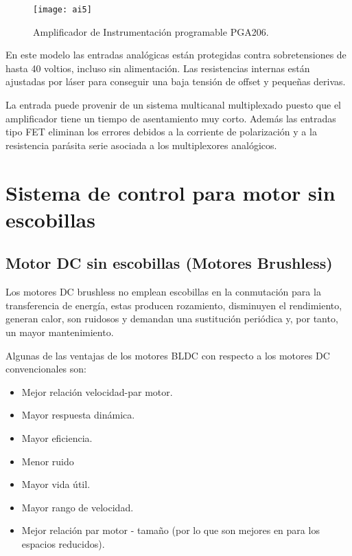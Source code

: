 \begin{figure}[h]
  \centering
  \texttt{[image: ai5]}
  \caption{Amplificador de Instrumentación programable PGA206.}\label{fig:programable}
\end{figure}

En este modelo las entradas analógicas están protegidas contra sobretensiones de hasta 40 voltios, incluso sin alimentación. Las resistencias internas están ajustadas por láser para conseguir una baja tensión de offset y pequeñas derivas.

La entrada puede provenir de un sistema multicanal multiplexado puesto que el amplificador tiene un tiempo de asentamiento muy corto. Además las entradas tipo FET eliminan los errores debidos a la corriente de polarización y a la resistencia parásita serie asociada a los multiplexores analógicos.




\section{Sistema de control para motor sin escobillas} %
\label{sec:sistema_de_control_para_motor_sin_escobillas}

\subsection{Motor DC sin escobillas (Motores Brushless)}
\label{subsec: motor_sin_escobillas}

Los motores DC brushless no emplean escobillas en la conmutación para la transferencia de energía, estas producen rozamiento, disminuyen el rendimiento, generan calor, son ruidosos y demandan una sustitución periódica y, por tanto, un mayor mantenimiento.

Algunas de las ventajas de los motores BLDC con respecto a los motores DC convencionales son:

\begin{itemize}
\item Mejor relación velocidad-par motor.
\item Mayor respuesta dinámica.
\item Mayor eficiencia.
\item Menor ruido
\item Mayor vida útil.
\item Mayor rango de velocidad.
\item Mejor relación par motor - tamaño (por lo que son mejores en para los espacios reducidos).
\end{itemize}

